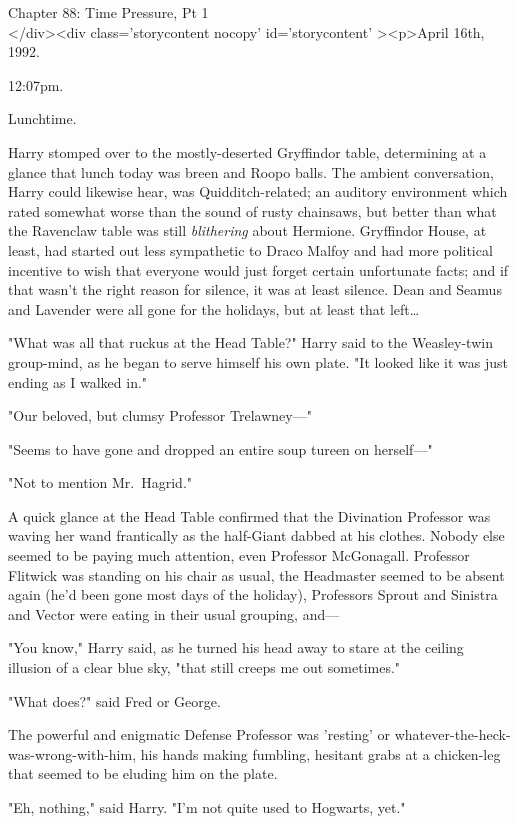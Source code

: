 
Chapter 88: Time Pressure, Pt 1\\
</div><div  class='storycontent nocopy' id='storycontent' ><p>April 16th, 1992.

12:07pm.

Lunchtime.

Harry stomped over to the mostly-deserted Gryffindor table, determining at a 
glance that lunch today was breen and Roopo balls. The ambient conversation, 
Harry could likewise hear, was Quidditch-related; an auditory environment which 
rated somewhat worse than the sound of rusty chainsaws, but better than what 
the Ravenclaw table was still \emph{blithering} about Hermione. Gryffindor 
House, at least, had started out less sympathetic to Draco Malfoy and had more 
political incentive to wish that everyone would just forget certain unfortunate 
facts; and if that wasn't the right reason for silence, it was at least 
silence. Dean and Seamus and Lavender were all gone for the holidays, but at 
least that left{\ldots}

"What was all that ruckus at the Head Table?" Harry said to the Weasley-twin 
group-mind, as he began to serve himself his own plate. "It looked like it was 
just ending as I walked in."

"Our beloved, but clumsy Professor Trelawney---"

"Seems to have gone and dropped an entire soup tureen on herself---"

"Not to mention Mr.~Hagrid."

A quick glance at the Head Table confirmed that the Divination Professor was 
waving her wand frantically as the half-Giant dabbed at his clothes. Nobody 
else seemed to be paying much attention, even Professor McGonagall. Professor 
Flitwick was standing on his chair as usual, the Headmaster seemed to be absent 
again (he'd been gone most days of the holiday), Professors Sprout and Sinistra 
and Vector were eating in their usual grouping, and---

"You know," Harry said, as he turned his head away to stare at the ceiling 
illusion of a clear blue sky, "that still creeps me out sometimes."

"What does?" said Fred or George.

The powerful and enigmatic Defense Professor was 'resting' or 
whatever-the-heck-was-wrong-with-him, his hands making fumbling, hesitant grabs 
at a chicken-leg that seemed to be eluding him on the plate.

"Eh, nothing," said Harry. "I'm not quite used to Hogwarts, yet."

